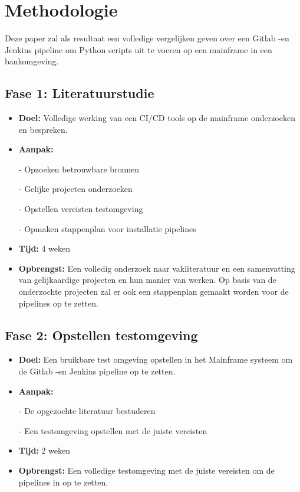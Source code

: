 \section{Methodologie}%
\label{sec:methodologie}
Deze paper zal als resultaat een volledige vergelijken geven over een Gitlab -en Jenkins pipeline om Python scripts uit te voeren op een mainframe in een bankomgeving. 

\subsection{Fase 1: Literatuurstudie}
\begin{itemize}
    \item \textbf{Doel:}
          Volledige werking van een CI/CD tools op de mainframe onderzoeken en bespreken.
    \item \textbf{Aanpak:}
          \item[-] Opzoeken betrouwbare bronnen
          \item[-] Gelijke projecten onderzoeken
          \item[-] Opstellen vereisten testomgeving
          \item[-] Opmaken stappenplan voor installatie pipelines
          
     \item \textbf{Tijd:} 4 weken
     \item \textbf{Opbrengst:}
           Een volledig onderzoek naar vakliteratuur en een samenvatting van gelijkaardige projecten en hun manier van werken. Op basis van de onderzochte projecten zal er ook een stappenplan gemaakt worden voor de pipelines op te zetten.  
\end{itemize}


\subsection{Fase 2: Opstellen testomgeving}
\begin{itemize}
    \item \textbf{Doel:}
    Een bruikbare test omgeving opstellen in het Mainframe systeem om de Gitlab -en Jenkins pipeline op te zetten.
    \item \textbf{Aanpak:}
    \item[-] De opgezochte literatuur bestuderen
    \item[-] Een testomgeving opstellen met de juiste vereisten
    \item \textbf{Tijd:} 2 weken
    \item \textbf{Opbrengst:}
    Een volledige testomgeving met de juiste vereisten om de pipelines in op te zetten.
\end{itemize}


